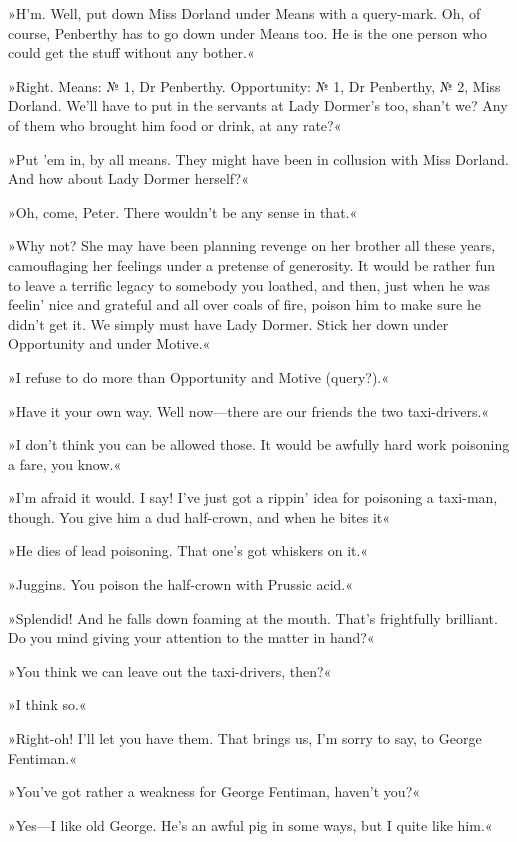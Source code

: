 »H'm. Well, put down Miss Dorland under Means with a query-mark. Oh, of course, Penberthy has to go down under Means too. He is the one person who could get the stuff without any bother.«

»Right. Means: № 1, Dr Penberthy. Opportunity: № 1, Dr Penberthy, № 2, Miss Dorland. We'll have to put in the servants at Lady Dormer's too, shan't we? Any of them who brought him food or drink, at any rate?«

»Put 'em in, by all means. They might have been in collusion with Miss Dorland. And how about Lady Dormer herself?«

»Oh, come, Peter. There wouldn't be any sense in that.«

»Why not? She may have been planning revenge on her brother all these years, camouflaging her feelings under a pretense of generosity. It would be rather fun to leave a terrific legacy to somebody you loathed, and then, just when he was feelin' nice and grateful and all over coals of fire, poison him to make sure he didn't get it. We simply must have Lady Dormer. Stick her down under Opportunity and under Motive.«

»I refuse to do more than Opportunity and Motive (query?).«

»Have it your own way. Well now—there are our friends the two taxi-drivers.«

»I don't think you can be allowed those. It would be awfully hard work poisoning a fare, you know.«

»I'm afraid it would. I say! I've just got a rippin' idea for poisoning a taxi-man, though. You give him a dud half-crown, and when he bites it\longdash«

»He dies of lead poisoning. That one's got whiskers on it.«

»Juggins. You poison the half-crown with Prussic acid.«

»Splendid! And he falls down foaming at the mouth. That's frightfully brilliant. Do you mind giving your attention to the matter in hand?«

»You think we can leave out the taxi-drivers, then?«

»I think so.«

»Right-oh! I'll let you have them. That brings us, I'm sorry to say, to George Fentiman.«

»You've got rather a weakness for George Fentiman, haven't you?«

»Yes—I like old George. He's an awful pig in some ways, but I quite like him.«

